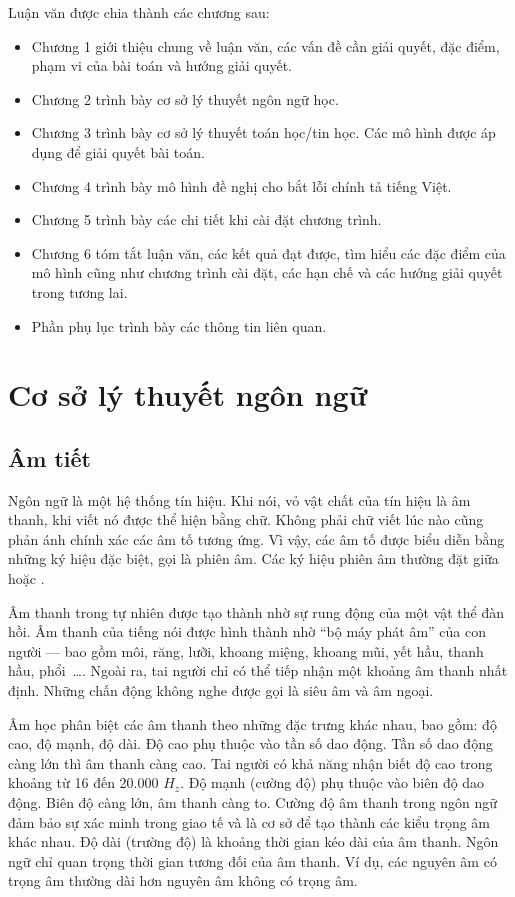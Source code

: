 \documentclass[a4paper,oneside,14pt]{extbook} %
\begin{document}
Luận văn được chia thành các chương sau:
\begin{itemize}
\item Chương 1 giới thiệu chung về luận văn, các vấn đề cần giải
  quyết, đặc điểm, phạm vi của bài toán và hướng giải quyết.
\item Chương 2 trình bày cơ sở lý thuyết ngôn ngữ học.
\item Chương 3 trình bày cơ sở lý thuyết toán học/tin học. Các mô hình
  được áp dụng để giải quyết bài toán.
\item Chương 4 trình bày mô hình đề nghị cho bắt lỗi chính tả tiếng Việt.
\item Chương 5 trình bày các chi tiết khi cài đặt chương trình.
\item Chương 6 tóm tắt luận văn, các kết quả đạt được, tìm hiểu các
  đặc điểm của mô hình   cũng như chương trình cài đặt, các hạn chế và
  các hướng giải quyết   trong tương lai.
\item Phần phụ lục trình bày các thông tin liên quan.
\end{itemize}

\chapter{Cơ sở lý thuyết ngôn ngữ}
\label{cha:vietnamese}
\minitoc


\section{Âm tiết}

Ngôn ngữ là một hệ thống tín hiệu. Khi nói, vỏ vật chất của tín hiệu
là âm thanh, khi viết nó được thể hiện bằng chữ. Không phải chữ viết
lúc nào cũng phản ánh chính xác các âm tố tương ứng. Vì vậy, các âm tố
được biểu diễn bằng những ký hiệu đặc biệt, gọi là phiên âm. Các ký
hiệu phiên âm thường đặt giữa \textipa{/\quad/} hoặc
\textipa{[\quad]}.

Âm thanh trong tự nhiên được tạo thành nhờ sự rung động của một vật
thể đàn hồi. Âm thanh của tiếng nói được hình thành nhờ ``bộ máy phát
âm'' của con người --- bao gồm môi, răng, lưỡi, khoang miệng, khoang
mũi, yết hầu, thanh hầu, phổi~\ldots{}. Ngoài ra, tai người chỉ có thể
tiếp nhận một khoảng âm thanh nhất định. Những chấn động không nghe
được gọi là siêu âm và âm ngoại.

Âm học phân biệt các âm thanh theo những đặc trưng khác nhau, bao gồm:
độ cao, độ mạnh, độ dài. Độ cao phụ thuộc vào tần số dao động. Tần số
dao động càng lớn thì âm thanh càng cao. Tai người có khả năng nhận
biết độ cao trong khoảng từ 16 đến 20.000 $H_z$. Độ mạnh (cường độ)
phụ thuộc vào biên độ dao động. Biên độ càng lớn, âm thanh càng
to. Cường độ âm thanh trong ngôn ngữ đảm bảo sự xác minh trong giao tế
và là cơ sở để tạo thành các kiểu trọng âm khác nhau. Độ dài (trường
độ) là khoảng thời gian kéo dài của âm thanh. Ngôn ngữ chỉ quan trọng
thời gian tương đối của âm thanh. Ví dụ, các nguyên âm có trọng âm
thường dài hơn nguyên âm không có trọng âm.
\end{document}
